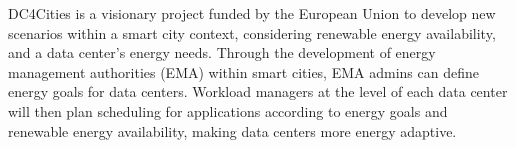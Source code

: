 DC4Cities \cite{DC4Cities} is a visionary project funded by the European Union to develop new scenarios within a smart city context, considering renewable energy availability, and a data center's energy needs. Through the development of energy management authorities (EMA) within smart cities, EMA admins can define energy goals for data centers. Workload managers at the level of each data center will then plan scheduling for applications according to energy goals and renewable
energy availability, making data centers more energy adaptive.